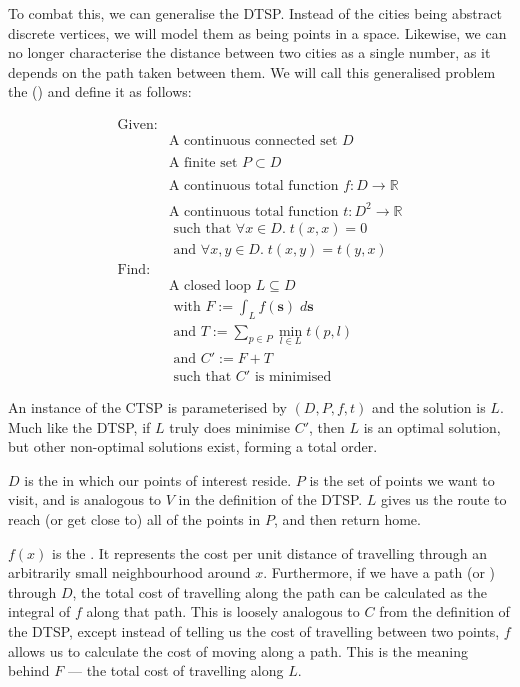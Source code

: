 To combat this, we can generalise the DTSP. Instead of the cities being abstract discrete vertices, we will model them as being points in a  space. Likewise, we can no longer characterise the distance between two cities as a single number, as it depends on the path taken between them. We will call this generalised problem the  () and define it as follows:

\begin{align*}
  \textrm{Given:} & \\
  &\textrm{A continuous connected set }D \\ \\
  &\textrm{A finite set }P\subset D \\ \\
  &\textrm{A continuous total function }f : D\rightarrow\mathbb{R} \\ \\
  &\textrm{A continuous total function }t : D^2\rightarrow\mathbb{R} \\
  &\textrm{ such that }\forall x \in D.\; t(x,x)=0 \\
  &\textrm{ and }\forall x,y \in D.\; t(x,y)=t(y,x) \\
  \textrm{Find:} & \\
  &\textrm{A closed loop }L\subseteq D \\
  &\textrm{ with }F:=\int_{L}f(\mathbf{s})\;d\mathbf{s} \\
  &\textrm{ and }T:=\sum_{p \in P} \min_{l\in L}{t(p,l)} \\
  &\textrm{ and }C':=F+T \\
  &\textrm{ such that }C'\textrm{ is minimised }
\end{align*}

An instance of the CTSP is parameterised by $(D,P,f,t)$ and the solution is $L$. Much like the DTSP, if $L$ truly does minimise $C'$, then $L$ is an optimal solution, but other non-optimal solutions exist, forming a total order.

$D$ is the  in which our points of interest reside. $P$ is the set of points we want to visit, and is analogous to $V$ in the definition of the DTSP. $L$ gives us the route to reach (or get close to) all of the points in $P$, and then return home.

$f(x)$ is the . It represents the cost per unit distance of travelling through an arbitrarily small neighbourhood around $x$. Furthermore, if we have a path (or ) through $D$, the total cost of travelling along the path can be calculated as the integral of $f$ along that path. This is loosely analogous to $C$ from the definition of the DTSP, except instead of telling us the cost of travelling between two points, $f$ allows us to calculate the cost of moving along a path. This is the meaning behind $F$ --- the total cost of travelling along $L$.

